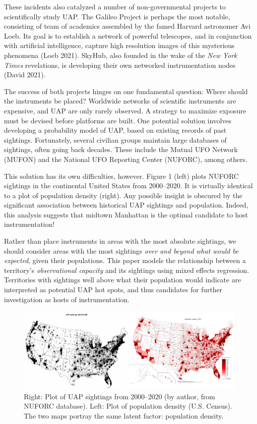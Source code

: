 \documentclass[]{elsarticle} %
\begin{document}
These incidents also catalyzed a number of non-governmental projects to
scientifically study UAP. The Galileo Project is perhaps the most
notable, consisting of team of academics assembled by the famed Harvard
astronomer Avi Loeb. Its goal is to establish a network of powerful
telescopes, and in conjunction with artificial intelligence, capture
high resolution images of this mysterious phenomena (Loeb 2021). SkyHub,
also founded in the wake of the \emph{New York Times} revelations, is
developing their own networked instrumentation nodes (David 2021).

The success of both projects hinges on one fundamental question: Where
should the instruments be placed? Worldwide networks of scientific
instruments are expensive, and UAP are only rarely observed. A strategy
to maximize exposure must be devised before platforms are built. One
potential solution involves developing a probability model of UAP, based
on existing records of past sightings. Fortunately, several civilian
groups maintain large databases of sightings, often going back decades.
These include the Mutual UFO Network (MUFON) and the National UFO
Reporting Center (NUFORC), among others.

This solution has its own difficulties, however. Figure 1 (left) plots
NUFORC sightings in the continental United States from 2000--2020. It is
virtually identical to a plot of population density (right). Any
possible insight is obscured by the significant association between
historical UAP sightings and population. Indeed, this analysis suggests
that midtown Manhattan is the optimal candidate to host instrumentation!

Rather than place instruments in areas with the most absolute sightings,
we should consider areas with the most sightings \emph{over and beyond
what would be expected}, given their populations. This paper models the
relationship between a territory's \emph{observational capacity} and its
sightings using mixed effects regression. Territories with sightings
well above what their population would indicate are interpreted as
potential UAP hot spots, and thus candidates for further investigation
as hosts of instrumentation.

\begin{figure}
\includegraphics[width=1\linewidth]{lmm_paper_files/figure-latex/unnamed-chunk-1-1} \caption{Right: Plot of UAP sightings from 2000--2020 (by author, from NUFORC database). Left: Plot of population density (U.S. Census). The two maps portray the same latent factor: population density.}\label{fig:unnamed-chunk-1}
\end{figure}
\end{document}
